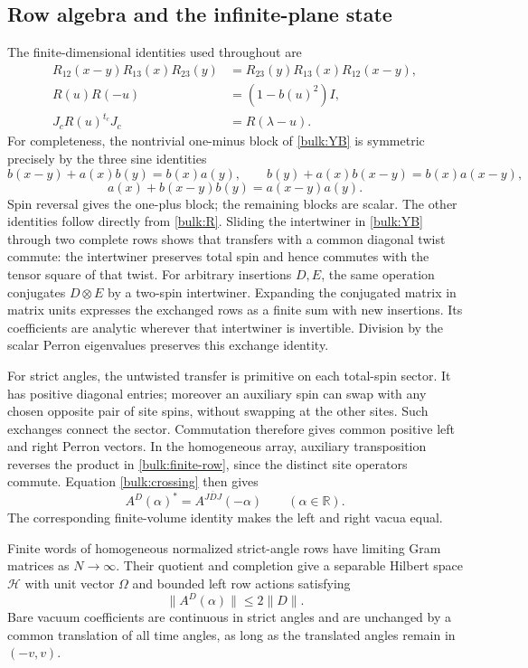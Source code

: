 \subsection{Row algebra and the infinite-plane state}

The finite-dimensional identities used throughout are
\begin{align}
 R_{12}(x-y)R_{13}(x)R_{23}(y)
 &=R_{23}(y)R_{13}(x)R_{12}(x-y),\label{bulk:YB}\\
 R(u)R(-u)&=(1-b(u)^2)I,\label{bulk:inversion}\\
 J_cR(u)^{t_c}J_c&=R(\lambda-u).\label{bulk:crossing}
\end{align}
For completeness, the nontrivial one-minus block of
\eqref{bulk:YB} is symmetric precisely by the three sine identities
\[
 b(x-y)+a(x)b(y)=b(x)a(y),\qquad
 b(y)+a(x)b(x-y)=b(x)a(x-y),
\]
\[
 a(x)+b(x-y)b(y)=a(x-y)a(y).
\]
Spin reversal gives the one-plus block; the remaining blocks are
scalar. The other identities follow directly from \eqref{bulk:R}.
Sliding the intertwiner in \eqref{bulk:YB} through two complete rows
shows that transfers with a common diagonal twist commute: the
intertwiner preserves total spin and hence commutes with the tensor
square of that twist. For arbitrary insertions $D,E$, the same
operation conjugates $D\otimes E$ by a two-spin intertwiner.
Expanding the conjugated matrix in matrix units expresses the
exchanged rows as a finite sum with new insertions. Its coefficients
are analytic wherever that intertwiner is invertible. Division by
the scalar Perron eigenvalues preserves this exchange identity.

For strict angles, the untwisted transfer is primitive on each
total-spin sector. It has positive diagonal entries; moreover an
auxiliary spin can swap with any chosen opposite pair of site
spins, without swapping at the other sites. Such exchanges connect
the sector. Commutation therefore gives common positive left and
right Perron vectors. In the homogeneous array, auxiliary
transposition reverses the product in \eqref{bulk:finite-row}, since
the distinct site operators commute. Equation \eqref{bulk:crossing}
then gives
\begin{equation}\label{bulk:adjoint}
 A^D(\alpha)^*=A^{J\overline D J}(-\alpha)
 \qquad(\alpha\in\mathbb R).
\end{equation}
The corresponding finite-volume identity makes the left and right
vacua equal.

\begin{lemma}\label{bulk:plane-kernels}
Finite words of homogeneous normalized strict-angle rows have
limiting Gram matrices as $N\to\infty$. Their quotient and completion
give a separable Hilbert space $\mathcal H$ with unit vector $\Omega$
and bounded left row actions satisfying
\begin{equation}\label{bulk:row-bound}
 \|A^D(\alpha)\|\le2\|D\|.
\end{equation}
Bare vacuum coefficients are continuous in strict angles and are
unchanged by a common translation of all time angles, as long as
the translated angles remain in $(-v,v)$.
\end{lemma}

